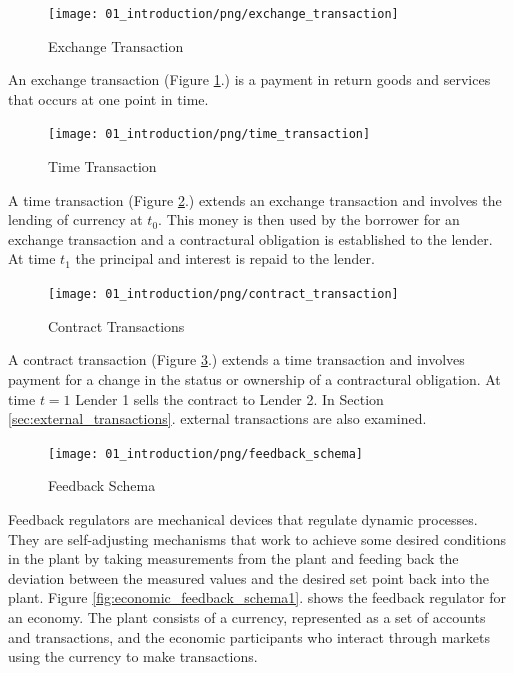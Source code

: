 \begin{figure}[H]
\centering
\texttt{[image: 01\_introduction/png/exchange\_transaction]}
\caption{Exchange Transaction}
\label{fig:exchange_transaction1}
\end{figure}

An exchange transaction (Figure \ref{fig:exchange_transaction1}.) is a payment in return goods and
services that occurs at one point in time.

\begin{figure}[H]
\centering
\texttt{[image: 01\_introduction/png/time\_transaction]}
\caption{Time Transaction}
\label{fig:time_transaction1}
\end{figure}

A time transaction (Figure \ref{fig:time_transaction1}.) extends an exchange transaction and involves
the lending of currency at $t_0$.  This money is then used by the borrower for an exchange
transaction and a contractural obligation is established to the lender. At time $t_1$ the principal
and interest is repaid to the lender.

\begin{figure}[H]
\centering
\texttt{[image: 01\_introduction/png/contract\_transaction]}
\caption{Contract Transactions}
\label{fig:contract_transaction1}
\end{figure}

A contract transaction (Figure \ref{fig:contract_transaction1}.) extends a time transaction and
involves payment for a change in the status or ownership of a contractural obligation. At time $t=1$
Lender 1 sells the contract to Lender 2. In Section \ref{sec:external_transactions}. external
transactions are also examined.

\begin{figure}[H]
\centering
\texttt{[image: 01\_introduction/png/feedback\_schema]}
\caption{Feedback Schema}
\label{fig:feedback_schema1}
\end{figure}

Feedback regulators are mechanical devices that regulate dynamic processes. They are self-adjusting
mechanisms that work to achieve some desired conditions in the plant by taking measurements from the
plant and feeding back the deviation between the measured values and the desired set point back into
the plant. Figure \ref{fig:economic_feedback_schema1}. shows the feedback regulator for an economy.
The plant consists of a currency, represented as a set of accounts and transactions, and the
economic participants who interact through markets using the currency to make transactions.

